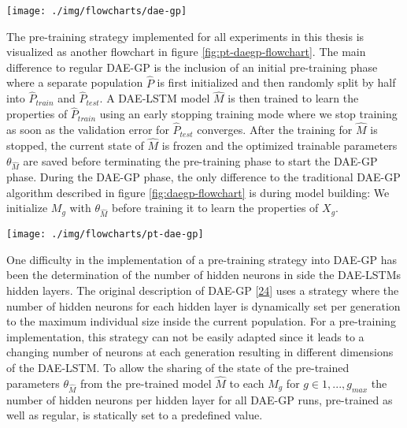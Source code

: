 \documentclass[
  11pt,
]{article}
\let\origfigure\figure
\let\endorigfigure\endfigure
\renewenvironment{figure}[1][2] {
    \expandafter\origfigure\expandafter[H]
} {
    \endorigfigure
}
\begin{document}
\begin{figure}[c]

{\centering \texttt{[image: ./img/flowcharts/dae-gp]} 

}

\caption{Regular DAE-GP Flowchart}\label{fig:daegp-flowchart}
\end{figure}

The pre-training strategy implemented for all experiments in this thesis is visualized as another flowchart in figure \ref{fig:pt-daegp-flowchart}.
The main difference to regular DAE-GP is the inclusion of an initial pre-training phase where a separate population \(\hat{P}\) is first initialized and then randomly split by half into \(\hat{P}_{train}\) and \(\hat{P}_{test}\).
A DAE-LSTM model \(\hat{M}\) is then trained to learn the properties of \(\hat{P}_{train}\) using an early stopping training mode where we stop training as soon as the validation error for \(\hat{P}_{test}\) converges.
After the training for \(\hat{M}\) is stopped, the current state of \(\hat{M}\) is frozen and the optimized trainable parameters \(\theta_{\hat{M}}\) are saved before terminating the pre-training phase to start the DAE-GP phase.
During the DAE-GP phase, the only difference to the traditional DAE-GP algorithm described in figure \ref{fig:daegp-flowchart} is during model building: We initialize \(M_g\) with \(\theta_{\hat{M}}\) before training it to learn the properties of \(X_g\).

\begin{figure}[c]

{\centering \texttt{[image: ./img/flowcharts/pt-dae-gp]} 

}

\caption{Pre-Trained DAE-GP Flowchart}\label{fig:pt-daegp-flowchart}
\end{figure}

One difficulty in the implementation of a pre-training strategy into DAE-GP has been the determination of the number of hidden neurons in side the DAE-LSTMs hidden layers. The original description of DAE-GP {[}\protect\hyperlink{ref-dae-gp_2020_rtree}{24}{]} uses a strategy where the number of hidden neurons for each hidden layer is dynamically set per generation to the maximum individual size inside the current population.
For a pre-training implementation, this strategy can not be easily adapted since it leads to a changing number of neurons at each generation resulting in different dimensions of the DAE-LSTM. To allow the sharing of the state of the pre-trained parameters \(\theta_{\hat{M}}\) from the pre-trained model \(\hat{M}\) to each \(M_g\) for \(g\in{1,...,g_{max}}\) the number of hidden neurons per hidden layer for all DAE-GP runs, pre-trained as well as regular, is statically set to a predefined value.
\end{document}

